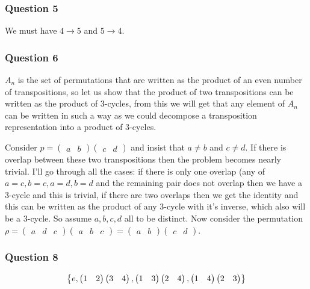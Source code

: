 \documentclass{article}
\begin{document}
\subsubsection{Question 5}
We must have $4\to 5$ and $5\to 4$.

\subsubsection{Question 6}
$A_n$ is the set of permutations that are written as the product of an even number of transpositions, so let us show that the product of two transpositions can be written as the product of 3-cycles, from this we will get that any element of $A_n$ can be written in such a way as we could decompose a transposition representation into a product of 3-cycles.

Consider $p = \left(\begin{matrix}
a&b
\end{matrix}\right)\left(\begin{matrix}
c&d
\end{matrix}\right)$ and insist that $a\not=b$ and $c\not=d$. If there is overlap between these two transpositions then the problem becomes nearly trivial. I'll go through all the cases: if there is only one overlap (any of $a=c,b=c,a=d,b=d$ and the remaining pair does not overlap then we have a 3-cycle and this is trivial, if there are two overlaps then we get the identity and this can be written as the product of any 3-cycle with it's inverse, which also will be a 3-cycle. So assume $a,b,c,d$ all to be distinct. Now consider the permutation  $ \rho = \left(\begin{matrix}
a&d&c
\end{matrix}\right)\left(\begin{matrix}
a&b&c
\end{matrix}\right) = \left(\begin{matrix}
a&b
\end{matrix}\right)\left(\begin{matrix}
c&d
\end{matrix}
\right)$.


\subsubsection{Question 8}

\[
\left\{ {
	e, \left(\begin{matrix}
	1&2
	\end{matrix}\right)\left(\begin{matrix}
	3&4
	\end{matrix}\right),\left(\begin{matrix}
	1&3
	\end{matrix}\right)\left(\begin{matrix}
	2&4
	\end{matrix}\right),\left(\begin{matrix}
	1&4
	\end{matrix}\right)\left(\begin{matrix}
	2&3
	\end{matrix}\right)
	} \right\}
\]
\end{document}
